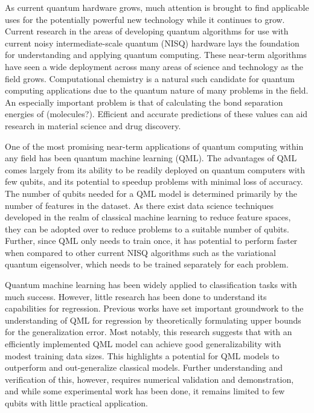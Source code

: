 \documentclass[journal=jacsat,manuscript=article]{achemso}
\begin{document}
As current quantum hardware grows, much attention is brought to find applicable uses for the potentially powerful new technology while it continues to grow. Current research in the areas of developing quantum algorithms for use with current noisy intermediate-scale quantum (NISQ) hardware lays the foundation for understanding and applying quantum computing. These near-term algorithms have seen a wide deployment across many areas of science and technology as the field grows. Computational chemistry is a natural such candidate for quantum computing applications due to the quantum nature of many problems in the field. An especially important problem is that of calculating the bond separation energies of (molecules?). Efficient and accurate predictions of these values can aid research in material science and drug discovery.\par

One of the most promising near-term applications of quantum computing within any field has been quantum machine learning (QML). The advantages of QML comes largely from its ability to be readily deployed on quantum computers with few qubits, and its potential to speedup problems with minimal loss of accuracy. The number of qubits needed for a QML model is determined primarily by the number of features in the dataset. As there exist data science techniques developed in the realm of classical machine learning to reduce feature spaces, they can be adopted over to reduce problems to a suitable number of qubits. Further, since QML only needs to train once, it has potential to perform faster when compared to other current NISQ algorithms such as the variational quantum eigensolver, which needs to be trained separately for each problem. \par

Quantum machine learning has been widely applied to classification tasks with much success. However, little research has been done to understand its capabilities for regression. Previous works have set important groundwork to the understanding of QML for regression by theoretically formulating upper bounds for the generalization error. Most notably, this research suggests that with an efficiently implemented QML model can achieve good generalizability with modest training data sizes.  This highlights a potential for QML models to outperform and out-generalize classical models. Further understanding and verification of this, however, requires numerical validation and demonstration, and while some experimental work has been done, it remains limited to few qubits with little practical application.\par 
\end{document}
